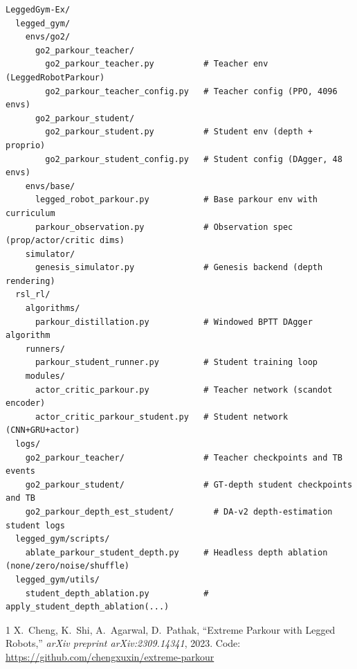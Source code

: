 \documentclass[11pt,a4paper]{article}
\begin{document}
\begin{lstlisting}[language={},frame=none,backgroundcolor=\color{white}]
LeggedGym-Ex/
  legged_gym/
    envs/go2/
      go2_parkour_teacher/
        go2_parkour_teacher.py          # Teacher env (LeggedRobotParkour)
        go2_parkour_teacher_config.py   # Teacher config (PPO, 4096 envs)
      go2_parkour_student/
        go2_parkour_student.py          # Student env (depth + proprio)
        go2_parkour_student_config.py   # Student config (DAgger, 48 envs)
    envs/base/
      legged_robot_parkour.py           # Base parkour env with curriculum
      parkour_observation.py            # Observation spec (prop/actor/critic dims)
    simulator/
      genesis_simulator.py              # Genesis backend (depth rendering)
  rsl_rl/
    algorithms/
      parkour_distillation.py           # Windowed BPTT DAgger algorithm
    runners/
      parkour_student_runner.py         # Student training loop
    modules/
      actor_critic_parkour.py           # Teacher network (scandot encoder)
      actor_critic_parkour_student.py   # Student network (CNN+GRU+actor)
  logs/
    go2_parkour_teacher/                # Teacher checkpoints and TB events
    go2_parkour_student/                # GT-depth student checkpoints and TB
    go2_parkour_depth_est_student/        # DA-v2 depth-estimation student logs
  legged_gym/scripts/
    ablate_parkour_student_depth.py     # Headless depth ablation (none/zero/noise/shuffle)
  legged_gym/utils/
    student_depth_ablation.py           # apply_student_depth_ablation(...)
\end{lstlisting}

\begin{thebibliography}{1}
  X.~Cheng, K.~Shi, A.~Agarwal, D.~Pathak,
  ``Extreme Parkour with Legged Robots,''
  \emph{arXiv preprint arXiv:2309.14341}, 2023.
  Code: \url{https://github.com/chengxuxin/extreme-parkour}
\end{thebibliography}
\end{document}
